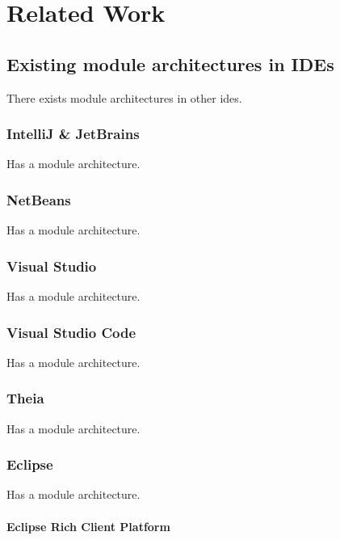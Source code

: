 \chapter{Related Work} \label{cha:related}

\section{Existing module architectures in IDEs}

There exists module architectures in other \gls{ide}s.

\subsection{IntelliJ \& JetBrains}

Has a module architecture.

\subsection{NetBeans}

Has a module architecture.

\subsection{Visual Studio}

Has a module architecture.

\subsection{Visual Studio Code}

Has a module architecture.

\subsection{Theia}

Has a module architecture.

\subsection{Eclipse}

Has a module architecture.

\subsubsection{Eclipse Rich Client Platform}

